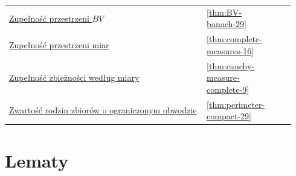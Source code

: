 \documentclass[11pt,a4paper,oneside]{book}
\numberwithin{equation}{chapter}
\theoremstyle{plain}
\theoremstyle{definition}
\theoremstyle{remark}
\begin{document}
\begin{longtable}{@{}p{0.72\linewidth}p{0.135\linewidth}p{0.08\linewidth}@{}}
\hyperref[thm:BV-banach-29]{Zupełność przestrzeni $BV$} & \ref*{thm:BV-banach-29} & \pageref*{thm:BV-banach-29} \\
\hyperref[thm:complete-measures-16]{Zupełność przestrzeni miar} & \ref*{thm:complete-measures-16} & \pageref*{thm:complete-measures-16} \\
\hyperref[thm:cauchy-measure-complete-9]{Zupełność zbieżności według miary} & \ref*{thm:cauchy-measure-complete-9} & \pageref*{thm:cauchy-measure-complete-9} \\
\hyperref[thm:perimeter-compact-29]{Zwartość rodzin zbiorów o ograniczonym obwodzie} & \ref*{thm:perimeter-compact-29} & \pageref*{thm:perimeter-compact-29} \\
\end{longtable}
\endgroup

\section*{Lematy}
\begingroup\small
\setlength\LTleft{0pt}\setlength\LTright{0pt}
\end{document}
